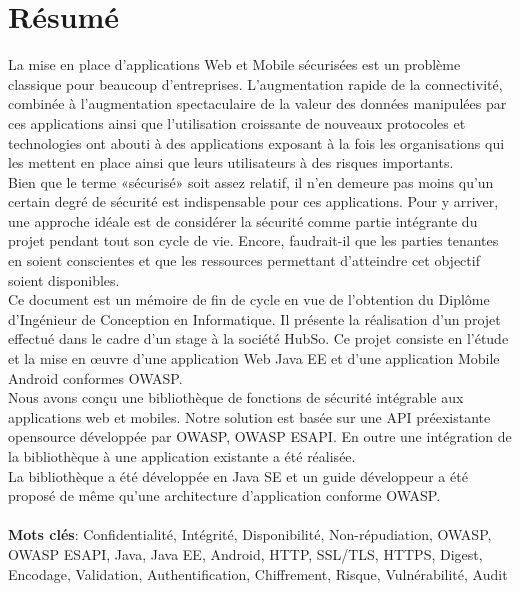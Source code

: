 
\chapter*{Résumé}

La mise en place d'applications Web et Mobile sécurisées est un problème classique pour beaucoup d'entreprises. L’augmentation rapide de la connectivité, combinée à l’augmentation spectaculaire de la valeur des données manipulées par ces applications ainsi que l’utilisation croissante de nouveaux protocoles et technologies ont abouti à des applications exposant à la fois les organisations qui les mettent en place ainsi que leurs utilisateurs à des risques importants.\\
Bien que le terme «sécurisé» soit assez relatif, il n'en demeure pas moins qu'un certain degré de sécurité est indispensable pour ces applications. Pour y arriver, une approche idéale est de considérer la sécurité comme partie intégrante du projet pendant tout son cycle de vie. Encore, faudrait-il que les parties tenantes en soient conscientes et que les ressources permettant d'atteindre cet objectif soient disponibles.\\
Ce document est un mémoire de fin de cycle en vue de l’obtention du Diplôme d’Ingénieur de Conception en Informatique. Il présente la réalisation d’un projet effectué dans le cadre d’un stage à la société HubSo. Ce projet consiste en l'étude et la mise en œuvre d'une application Web Java EE et d'une application Mobile Android conformes OWASP.\\
Nous avons conçu une bibliothèque de fonctions de sécurité intégrable aux applications web et mobiles. Notre solution est basée sur une API préexistante opensource développée par OWASP, OWASP ESAPI. En outre une intégration de la bibliothèque à une application existante a été réalisée.\\
La bibliothèque a été développée en Java SE et un guide développeur a été proposé de même qu'une architecture d'application conforme OWASP.\\ \\
\textbf{Mots clés}: Confidentialité, Intégrité, Disponibilité, Non-répudiation, OWASP, OWASP ESAPI, Java, Java EE, Android, HTTP, SSL/TLS, HTTPS, Digest, Encodage, Validation, Authentification, Chiffrement, Risque, Vulnérabilité, Audit



\clearpage
